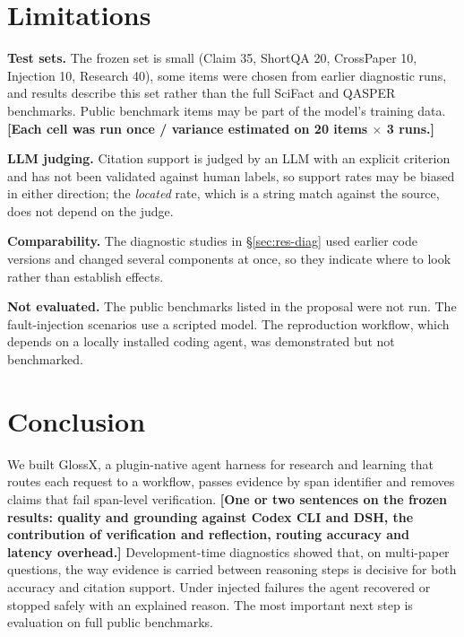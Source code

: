 \documentclass{article}
\newcommand{\sysname}{GlossX}
\newcommand{\ds}[1]{\textsf{#1}}
\newcommand{\TBD}[1]{\textcolor{glred}{\textbf{[#1]}}}
\begin{document}
\section{Limitations}
\label{sec:limits}

\textbf{Test sets.} The frozen set is small (\ds{Claim} 35, \ds{ShortQA} 20, \ds{CrossPaper} 10, \ds{Injection} 10, \ds{Research} 40), some items were chosen from earlier diagnostic runs, and results describe this set rather than the full SciFact and QASPER benchmarks. Public benchmark items may be part of the model's training data. \TBD{Each cell was run once / variance estimated on 20 items $\times$ 3 runs.}

\textbf{LLM judging.} Citation support is judged by an LLM with an explicit criterion and has not been validated against human labels, so support rates may be biased in either direction; the \emph{located} rate, which is a string match against the source, does not depend on the judge.

\textbf{Comparability.} The diagnostic studies in \S\ref{sec:res-diag} used earlier code versions and changed several components at once, so they indicate where to look rather than establish effects.

\textbf{Not evaluated.} The public benchmarks listed in the proposal were not run. The fault-injection scenarios use a scripted model. The reproduction workflow, which depends on a locally installed coding agent, was demonstrated but not benchmarked.

\section{Conclusion}
\label{sec:conclusion}

We built \sysname{}, a plugin-native agent harness for research and learning that routes each request to a workflow, passes evidence by span identifier and removes claims that fail span-level verification. \TBD{One or two sentences on the frozen results: quality and grounding against Codex CLI and DSH, the contribution of verification and reflection, routing accuracy and latency overhead.} Development-time diagnostics showed that, on multi-paper questions, the way evidence is carried between reasoning steps is decisive for both accuracy and citation support. Under injected failures the agent recovered or stopped safely with an explained reason. The most important next step is evaluation on full public benchmarks.
\end{document}
